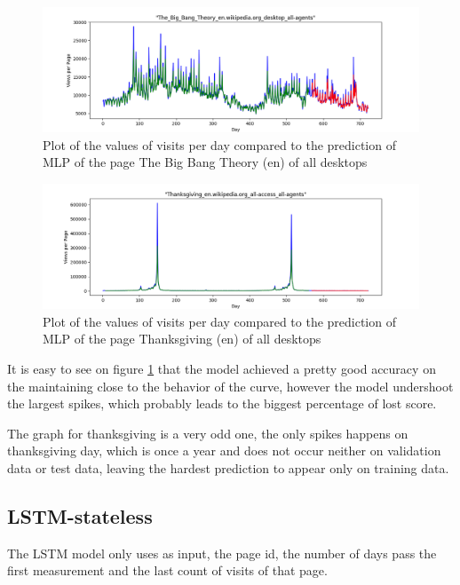 \begin{figure}
	\centering
	\includegraphics[width=\linewidth]{model_1_TBT.png}
	\caption{Plot of the values of visits per day compared to the prediction of MLP of the page The Big Bang Theory (en) of all desktops\label{fig:model_1_TBT}}
\end{figure}

\begin{figure}
	\centering
	\includegraphics[width=\linewidth]{model_1_TG.png}
	\caption{Plot of the values of visits per day compared to the prediction of MLP of the page Thanksgiving (en) of all desktops\label{fig:model_1_TG}}
\end{figure}

It is easy to see on figure \ref{fig:model_1_TBT} that the model achieved a pretty good accuracy on the maintaining close to the behavior of the curve,
however the model undershoot the largest spikes, which probably leads to the biggest percentage of lost score.

The graph for thanksgiving is a very odd one, the only spikes happens on thanksgiving day,
which is once a year and does not occur neither on validation data or test data,
leaving the hardest prediction to appear only on training data.

\subsection{LSTM-stateless}

The LSTM model only uses as input, the page id,
the number of days pass the first measurement and the last count of visits of that page.

